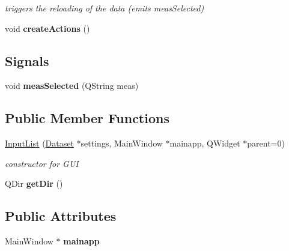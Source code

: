 \begin{CompactItemize}
\begin{CompactList}\small\item\em triggers the reloading of the data (emits measSelected) \item\end{CompactList}\item 
\hypertarget{class_input_list_258a10106a7eff5f879c615d25098b69}{
void \textbf{createActions} ()}
\label{class_input_list_258a10106a7eff5f879c615d25098b69}

\end{CompactItemize}
\subsection*{Signals}
\begin{CompactItemize}
\item 
\hypertarget{class_input_list_89d58b3cffd4bec9d8e32bce7458a80d}{
void \textbf{measSelected} (QString meas)}
\label{class_input_list_89d58b3cffd4bec9d8e32bce7458a80d}

\end{CompactItemize}
\subsection*{Public Member Functions}
\begin{CompactItemize}
\item 
\hypertarget{class_input_list_96dc3f6c58a303932aa34c98f32d83af}{
\hyperlink{class_input_list_96dc3f6c58a303932aa34c98f32d83af}{InputList} (\hyperlink{class_dataset}{Dataset} $\ast$settings, MainWindow $\ast$mainapp, QWidget $\ast$parent=0)}
\label{class_input_list_96dc3f6c58a303932aa34c98f32d83af}

\begin{CompactList}\small\item\em constructor for GUI \item\end{CompactList}\item 
\hypertarget{class_input_list_354a805c0276577e1e04084622b7475d}{
QDir \textbf{getDir} ()}
\label{class_input_list_354a805c0276577e1e04084622b7475d}

\end{CompactItemize}
\subsection*{Public Attributes}
\begin{CompactItemize}
\item 
\hypertarget{class_input_list_3bf71eaf1f6651901e1911bd71035c99}{
MainWindow $\ast$ \textbf{mainapp}}
\label{class_input_list_3bf71eaf1f6651901e1911bd71035c99}

\end{CompactItemize}
